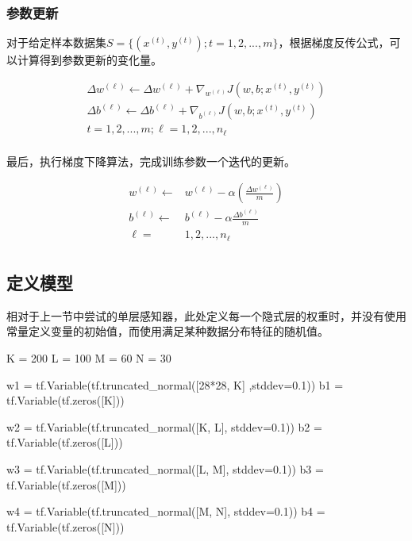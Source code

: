 \begin{content}
\subsubsection{参数更新}

对于给定样本数据集$ S = \{ ({x^{(t)}},{y^{(t)}});t = 1,2,...,m\} $，根据梯度反传公式，可以计算得到参数更新的变化量。

\[\begin{aligned}
  \Delta {w^{(\ell )}} \leftarrow \Delta {w^{(\ell )}} + {\nabla _{{w^{(\ell )}}}}J\left( {w,b;{x^{(t)}},{y^{(t)}}} \right) \\ 
  \Delta {b^{(\ell )}} \leftarrow \Delta {b^{(\ell )}} + {\nabla _{{b^{(\ell )}}}}J\left( {w,b;{x^{(t)}},{y^{(t)}}} \right) \\ 
  t = 1,2,...,m;\ell  = 1,2,...,{n_\ell } \\ 
\end{aligned} \]

最后，执行梯度下降算法，完成训练参数一个迭代的更新。

\[\begin{aligned}
  {w^{(\ell )}} \leftarrow  & {w^{(\ell )}} - \alpha \left( {\frac{{\Delta {w^{(\ell )}}}}{m}} \right) \\ 
  {b^{(\ell )}} \leftarrow  & {b^{(\ell )}} - \alpha \frac{{\Delta {b^{(\ell )}}}}{m} \\ 
  \ell  = & 1,2,...,{n_\ell }  \\
\end{aligned} \]

\subsection{定义模型}

相对于上一节中尝试的单层感知器，此处定义每一个隐式层的权重时，并没有使用常量定义变量的初始值，而使用满足某种数据分布特征的随机值。

\begin{leftbar}
\begin{python}
K = 200
L = 100
M = 60
N = 30

w1 = tf.Variable(tf.truncated_normal([28*28, K] ,stddev=0.1)) 
b1 = tf.Variable(tf.zeros([K]))

w2 = tf.Variable(tf.truncated_normal([K, L], stddev=0.1))
b2 = tf.Variable(tf.zeros([L]))

w3 = tf.Variable(tf.truncated_normal([L, M], stddev=0.1)) 
b3 = tf.Variable(tf.zeros([M]))

w4 = tf.Variable(tf.truncated_normal([M, N], stddev=0.1)) 
b4 = tf.Variable(tf.zeros([N]))


\end{python}
\end{leftbar}
\end{content}
